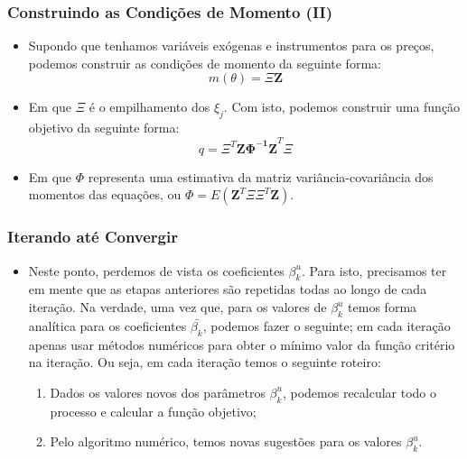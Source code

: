 \documentclass{beamer}
\begin{document}
\begin{frame}\frametitle{Construindo as Condições de Momento (II)}

\begin{itemize}
\item Supondo que tenhamos variáveis exógenas e instrumentos para os preços,
podemos construir as condições de momento da seguinte forma:
\[
m(\theta)=\Xi\mathbf{Z}
\]
\item Em que $\Xi$ é o empilhamento dos $\xi_{j}$. Com isto, podemos construir
uma função objetivo da seguinte forma:
\[
q=\Xi^{T}\mathbf{Z\Phi^{-1}Z}^{T}\Xi
\]
\item Em que $\Phi$ representa uma estimativa da matriz variância-covariância
dos momentos das equações, ou $\Phi=E(\mathbf{Z}^{T}\Xi\Xi^{T}\mathbf{Z})$. 
\end{itemize}



\end{frame}

\begin{frame}\frametitle{Iterando até Convergir}

\begin{itemize}
\item Neste ponto, perdemos de vista os coeficientes $\beta_{k}^{u}$. Para
isto, precisamos ter em mente que as etapas anteriores são repetidas
todas ao longo de cada iteração. Na verdade, uma vez que, para os
valores de $\beta_{k}^{u}$ temos forma analítica para os coeficientes
$\bar{\beta_{k}}$, podemos fazer o seguinte; em cada iteração apenas
usar métodos numéricos para obter o mínimo valor da função critério
na iteração. Ou seja, em cada iteração temos o seguinte roteiro:

\begin{enumerate}
\item Dados os valores novos dos parâmetros $\beta_{k}^{u}$, podemos recalcular
todo o processo e calcular a função objetivo;
\item Pelo algoritmo numérico, temos novas sugestões para os valores $\beta_{k}^{u}$.
\end{enumerate}
\end{itemize}
\end{frame}

\begin{frame}[allowframebreaks]



\end{frame}

\end{document}
